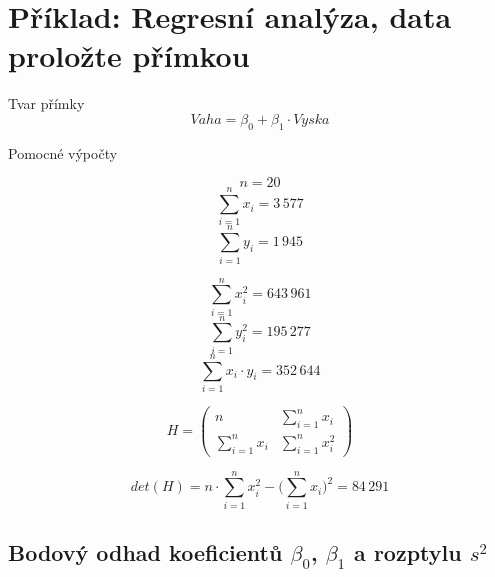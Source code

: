 \section{Příklad: Regresní analýza, data proložte přímkou}

\begin{compactitem}
    \item Tvar přímky
    $${\displaystyle Vaha = \beta_0 + \beta_1 \cdot Vyska}$$

    \item Pomocné výpočty
\end{compactitem}

\begin{minipage}{0.49\textwidth}
    $${\displaystyle n = 20}$$
    $${\displaystyle \sum_{i=1}^n x_i = 3 \, 577}$$
    $${\displaystyle \sum_{i=1}^n y_i = 1 \, 945}$$
\end{minipage}
%
\begin{minipage}{0.49\textwidth}
    $${\displaystyle \sum_{i=1}^n x_i^2 = 643 \, 961}$$
    $${\displaystyle \sum_{i=1}^n y_i^2 = 195 \, 277}$$
    $${\displaystyle \sum_{i=1}^n x_i \cdot y_i = 352 \, 644}$$
\end{minipage}

$${\displaystyle
    H = \begin{pmatrix}
        n                       & \sum\limits_{i=1}^n x_i   \\
        \sum\limits_{i=1}^n x_i & \sum\limits_{i=1}^n x_i^2
    \end{pmatrix}
}$$

$${\displaystyle det(H) = n \cdot \sum_{i=1}^n x_i^2 - \Bigg( \sum_{i=1}^n x_i \Bigg)^2 = 84 \, 291}$$

\subsection{Bodový odhad koeficientů ${\displaystyle \beta_0}$, ${\displaystyle \beta_1}$ a rozptylu ${\displaystyle s^2}$}

